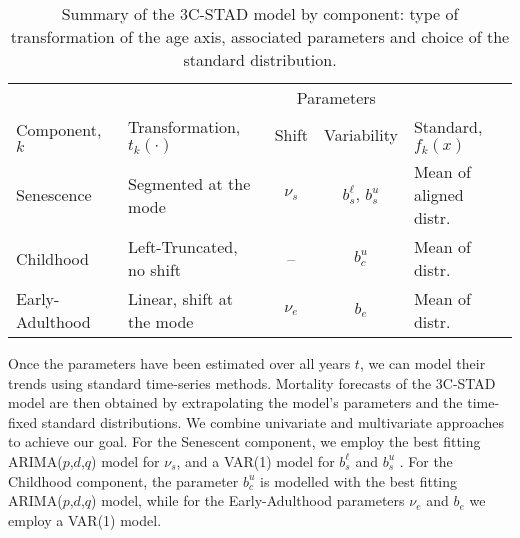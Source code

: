 \documentclass[Thesis]{subfiles}
\begin{document}
\begin{table}[!ht]
	\centering
	\begin{tabular}{l|l|c|c|l}
		\multicolumn{1}{c|}{}                                & \multicolumn{1}{c|}{}                                                 & \multicolumn{2}{c|}{Parameters}         & \multicolumn{1}{c}{}                                  \\
		\multicolumn{1}{l|}{\multirow{-2}{*}{Component, $k$}} & \multicolumn{1}{l|}{\multirow{-2}{*}{Transformation, $t_{k}(\cdot)$}} & Shift     & Variability & \multicolumn{1}{l}{\multirow{-2}{*}{Standard, $f_{k}(x)$}} \\ \midrule 
		\rowcolor{my-grey}  
		Senescence                                           & Segmented at the mode                                                 & $\nu_{s}$ & $b_{s}^{\ell},\,b_{s}^{u}$  & Mean of aligned distr.                                \\
		Childhood                                            & Left-Truncated, no shift                                              & --        & $b_{c}^{u}$                 & Mean of distr.                                        \\
		\rowcolor{my-grey} 
		Early-Adulthood $\;$                                          & Linear, shift at the mode $\;$                                            & $\nu_{e}$ & $b_{e}$                     & Mean of distr.       \\ 
		
		\bottomrule                                  
	\end{tabular}
	\caption{Summary of the 3C-STAD model by component: type of transformation of the age axis, associated parameters and choice of the standard distribution.}\label{Table:Model}
\end{table}

Once the parameters have been estimated over all years $t$, we can model their trends using standard time-series methods. Mortality forecasts of the 3C-STAD model are then obtained by extrapolating the model's parameters and the time-fixed standard distributions. We combine univariate and multivariate approaches to achieve our goal. For the Senescent component, we employ the best fitting ARIMA($p$,$d$,$q$) model for $\nu_{s}$, and a VAR(1) model for $b^{\ell}_{s}$ and $b^{u}_{s}$ \cite[as in][]{basellini2019modelling}. For the Childhood component, the parameter $b_{c}^{u}$ is modelled with the best fitting ARIMA($p$,$d$,$q$) model, while for the Early-Adulthood parameters $\nu_{e}$ and $b_{e}$ we employ a VAR(1) model.
\end{document}
